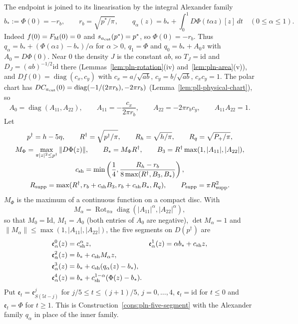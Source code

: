 The endpoint is joined to its linearisation by the integral Alexander family
\begin{equation}\label{eq:scalar-alexander}
 b_*:=\Phi(0)=-r_b,\qquad r_b=\sqrt{p^*/\pi},\qquad
 q_\alpha(z)=b_*+\int_0^1D\Phi(t\alpha z)[z]\,dt\quad(0\le\alpha\le1).
\end{equation}
Indeed $f(0)=F_{\rm M}(0)=0$ and $s_{a_{\rm cut}}(p^*)=p^*$, so $\Phi(0)=-r_b$. Thus
$q_\alpha=b_*+(\Phi(\alpha z)-b_*)/\alpha$ for $\alpha>0$, $q_1=\Phi$ and $q_0=b_*+A_0z$ with $A_0=D\Phi(0)$. Near
$0$ the density $J$ is the constant $ab$, so $T_J=\mathrm{id}$ and $D_J=(ab)^{-1/2}\mathrm{id}$ there
(Lemmas~\ref{lem:pln-rotation}(iv) and~\ref{lem:pln-area}(v)), and $Df(0)=\operatorname{diag}(c_x,c_y)$ with
$c_x=a/\sqrt{ab}$, $c_y=b/\sqrt{ab}$, $c_xc_y=1$. The polar chart has $DC_{a_{\rm cut}}(0)=\operatorname{diag}(-1/(2\pi r_b),
-2\pi r_b)$ (Lemma~\ref{lem:pll-physical-chart}), so
\[
 A_0=\operatorname{diag}(A_{11},A_{22}),\qquad
 A_{11}=-\frac{c_x}{2\pi r_b},\qquad A_{22}=-2\pi r_bc_y,\qquad A_{11}A_{22}=1.
\]
Let
\begin{gather}\label{eq:scalar-path-constants}
 p^\dagger=h-5\eta,\qquad R^\dagger=\sqrt{p^\dagger/\pi},\qquad R_h=\sqrt{h/\pi},\qquad
 R_q=\sqrt{P_+/\pi},\\
 M_\Phi=\max_{\pi|z|^2\le p^\dagger}\|D\Phi(z)\|,\qquad B_*=M_\Phi R^\dagger,\qquad
 B_3=R^\dagger\max(1,|A_{11}|,|A_{22}|),\notag\\
 c_{\rm sh}=\min\left(\frac14,\frac{R_h-r_b}{8\max(R^\dagger,B_3,B_*)}\right),\notag\\
 R_{\rm supp}=\max(R^\dagger,r_b+c_{\rm sh}B_3,r_b+c_{\rm sh}B_*,R_q),\qquad
 P_{\rm supp}=\pi R_{\rm supp}^2.\notag
\end{gather}
$M_\Phi$ is the maximum of a continuous function on a compact disc. With
\[
 M_\alpha=\operatorname{Rot}_{\pi\alpha}\operatorname{diag}(|A_{11}|^\alpha,|A_{22}|^\alpha),
\]
so that $M_0=\mathrm{Id}$,
$M_1=A_0$ (both entries of $A_0$ are negative), $\det M_\alpha=1$ and $\|M_\alpha\|\le\max(1,|A_{11}|,|A_{22}|)$, the five
segments on $D(p^\dagger)$ are
\begin{equation}\label{eq:scalar-five-segments}
\begin{aligned}
 \mathfrak e^0_\alpha(z)&=c_{\rm sh}^{\alpha}z,&
 \mathfrak e^1_\alpha(z)&=\alpha b_*+c_{\rm sh}z,\\
 \mathfrak e^2_\alpha(z)&=b_*+c_{\rm sh}M_\alpha z,\\
 \mathfrak e^3_\alpha(z)&=b_*+c_{\rm sh}(q_\alpha(z)-b_*),\\
 \mathfrak e^4_\alpha(z)&=b_*+c_{\rm sh}^{1-\alpha}(\Phi(z)-b_*).
\end{aligned}
\end{equation}
Put $\mathfrak e_t=\mathfrak e^j_{S(5t-j)}$ for $j/5\le t\le(j+1)/5$, $j=0,\dots,4$, $\mathfrak e_t=\mathrm{id}$ for $t\le0$
and $\mathfrak e_t=\Phi$ for $t\ge1$. This is Construction~\ref{cons:pln-five-segment} with the Alexander family $q_\alpha$
in place of the inner family.

